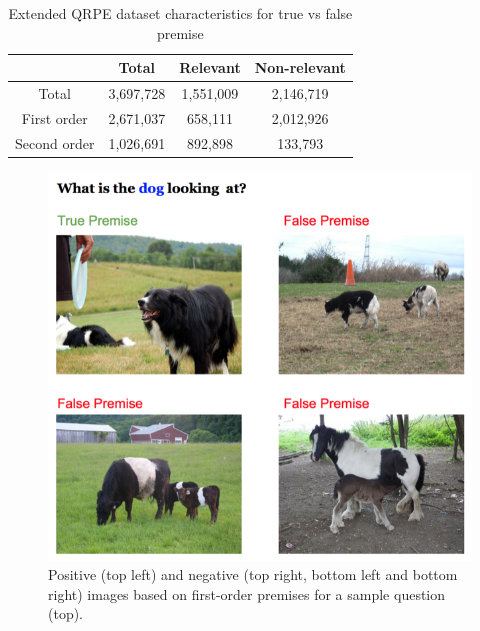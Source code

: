 \begin{table}[t]
	\centering
    \begin{tabular}{c|c|c|c} \toprule
    			& Total & Relevant & Non-relevant \\ \hline
        Total 	& 3,697,728 & 1,551,009 & 2,146,719 \\ \hline
        First order & 2,671,037 & 658,111 & 2,012,926 \\ \hline
        Second order & 1,026,691 & 892,898 & 133,793 \\ \bottomrule
    \end{tabular}
    \caption{Extended QRPE dataset characteristics for true vs false premise}
    \label{table:dataset}
\end{table}


\begin{figure}[t]
\begin{center}
  \includegraphics[width=0.9\linewidth]{images/First_Order.png}
\end{center}
   \caption{Positive (top left) and negative (top right, bottom left and bottom right) images based on first-order premises for a sample question (top).}
\label{fig:first_order}
\end{figure}

